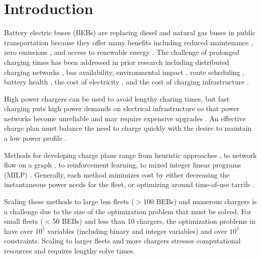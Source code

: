 \section{Introduction} 
\par Battery electric buses (BEBs) are replacing diesel and natural gas buses in public transportation because they offer many benefits \cite{Mahmoud2016} including reduced maintenance \cite{poornesh_comparative_2020}, zero emissions \cite{kato_comparative_2013}, and access to renewable energy \cite{cheng_smart_2020}.  The challenge of prolonged charging times has been addressed in prior research including distributed charging networks \cite{Nimalsiri2020}, bus availability, environmental impact \cite{zhou_bi-objective_2021}, route scheduling \cite{Rinalde_Mixed_2020}, battery health \cite{houbbadi_optimal_2019}, the cost of electricity \cite{Leou_optimal_2017}, and the cost of charging infrastructure \cite{Wei2018}.

\par High power chargers can be used to avoid lengthy charing times, but fast charging puts high power demands on electrical infrastructure \cite{stahleder_impact_2019} so that power networks become unreliable \cite{deb_impact_2017} and may require expensive upgrades \cite{boonraksa_impact_2019}. An effective charge plan must balance the need to charge quickly with the desire to maintain a low power profile \cite{ojer_development_2020}.

\par Methods for developing charge plans range from heuristic approaches \cite{qin_numerical_2016}, to network flow on a graph \cite{whitaker_network_2023}, to reinforcement learning\cite{Wang2019}, to mixed integer linear programs (MILP) \cite{bagherinezhad_spatio-temporal_2020}. Generally, each method minimizes cost by either decreasing the instantaneous power needs for the fleet, or optimizing around time-of-use tarrifs \cite{He_2019_Fast}.

\par Scaling these methods to large bus fleets ($>$100 BEBs) and numerous chargers is a challenge due to the size of the optimization problem that must be solved.  For small fleets ($<$50 BEBs) and less than 10 chargers, the optimization problems in \cite{whitaker_network_2023,bagherinezhad_spatio-temporal_2020,He_2019_Fast} have over $10^5$ variables (including binary and integer variables) and over $10^5$ constraints.  Scaling to larger fleets and more chargers stresses computational resources and requires lengthy solve times.


